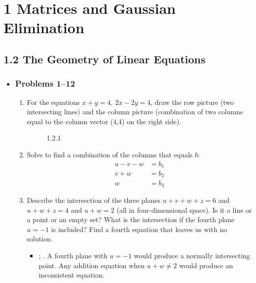 \chapter{1 Matrices and Gaussian Elimination}


\section{1.2 The Geometry of Linear Equations}
\begin{itemize}
  \item []

  \subsection{Problems 1--12}
  \begin{enumerate}\color{foreground-2}
    \item For the equations \( x + y = 4, ~ 2x - 2y = 4 \), draw the row picture (two
      intersecting lines) and the column picture (combination of two columns
      equal to the column vector (4,4) on the right side).

      \begin{figure}[ht]
          \centering
          \caption{1.2.1}
      \end{figure}

    \item Solve to find a combination of the columns that equals \(b\):
      \begin{align*}
        u - v - w &= b_1 \\
        v + w &= b_2 \\
        w &= b_3
      \end{align*}
      \vspace{-35pt}
      \vspace{-18pt}

    \item Describe the intersection of the three planes \(  u+v+w+z = 6 \) and
      \( u+w+z = 4 \) and \( u+w = 2 \) (all in four-dimensional space). Is it
      a line or a point or an empty set? What is the intersection if the fourth
      plane \( u = -1 \) is included? Find a fourth equation that leaves us
      with no solution.
      \begin{itemize}\color{foreground}
        \item {}; . A fourth plane
          with \( u = -1 \) would produce a normally intersecting point. Any
          addition equation when \( u + w \neq 2 \) would produce an
          inconsistent equation.
      \end{itemize}


\end{enumerate}
\end{itemize}
